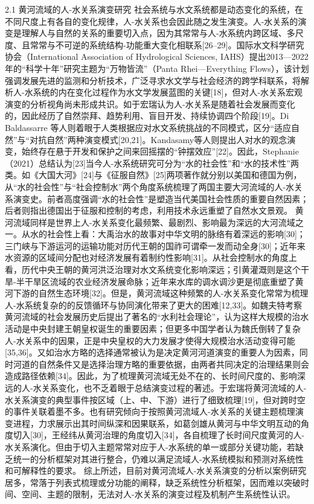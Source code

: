 2.1 黄河流域的人-水关系演变研究
社会系统与水文系统都是动态变化的系统，在不同尺度上有各自的变化规律，人-水关系也会因此随之发生演变。人-水关系的演变是理解人与自然的关系的重要切入点，因为其常常与人-水系统内跨区域、多尺度、且常常与不可逆的系统结构-功能重大变化相联系[26–29]。国际水文科学研究协会（International Association of Hydrological Sciences, IAHS）提出2013—2022年的“科学十年”研究主题为“万物皆流”（Panta Rhei—Everything Flows），该计划强调发展先进的监测和分析技术，广泛寻求水文学与社会经济的跨学科联系，将解析人-水系统的内在变化过程作为水文学发展蓝图的关键[18]，但对人-水关系宏观演变的分析视角尚未形成共识。如于宏瑞认为人-水关系是随着社会发展而变化的，因此经历了自然崇拜、趋势利用、盲目开发、持续协调四个阶段[19]。Di Baldassarre 等人则着眼于人类根据应对水文系统挑战的不同模式，区分“适应自然”与“对抗自然”两种演变模式[20,21]。Kandasamy等人则提出人对水的观念演变，始终存在悬于开发和保护之间来回摇摆的“钟摆效应”[22]。因此，Stephanie（2021）总结认为[23]当今人-水系统研究可分为“水的社会性”和“水的技术性”两类。如《大国大河》[24]与《征服自然》[25]两项著作就分别以美国和德国为例，从“水的社会性”与“社会控制水”两个角度系统梳理了两国主要大河流域的人-水关系演变史。前者高度强调“水的社会性”是塑造当代美国社会性质的重要自然因素；后者则指出德国出于征服和控制的考虑，利用技术永远重塑了自然水文景观。
黄河流域同样是世界上人-水关系变化最频繁、最剧烈、影响最为深远的大河流域之一。从水的社会性上看：大禹治水的故事对中华文明的脉络有着深远的影响[30]；三门峡与下游运河的运输功能对历代王朝的国祚可谓牵一发而动全身[30]；近年来水资源的区域间分配也对经济发展有着制约性影响[31]。从社会控制水的角度上看，历代中央王朝的黄河洪泛治理对水文系统变化影响深远；引黄灌溉则是这个干旱-半干旱区流域的农业经济发展命脉；近年来水库的调水调沙更是彻底重塑了黄河下游的自然生态环境[32]。但是，黄河流域这种频繁的人-水关系变化常常为梳理人-水系统复杂的的反馈循环与协同演化带来了更大的困难[12,33]。如魏夫特考察黄河流域的社会发展历史后提出了著名的“水利社会理论”，认为这样大规模的治水活动是中央封建王朝皇权诞生的重要因素；但更多中国学者认为魏氏倒转了复杂人-水关系中的因果，正是中央皇权的大力发展才使得大规模治水活动变得可能[35,36]。又如治水方略的选择通常被认为是决定黄河河道演变的重要人为因素，同时河道的自然条件又是选择治理方略的重要依据，由两者共同决定的治理结果则会造成路径依赖[34]。因此，为了梳理黄河流域无处不在的、长时间尺度的、影响深远的人-水关系变化，也不乏着眼于总结演变过程的著述。于宏瑞将黄河流域的人-水关系演变的典型事件按区域（上、中、下游）进行了细致梳理[19]，但对跨时空的事件关联着墨不多。也有研究倾向于按照黄河流域人-水关系的关键主题梳理演变进程，力求展示出其时间纵深和因果联系，如葛剑雄从黄河与中华文明互动的角度切入[30]，王经纬从黄河治理的角度切入[34]，各自梳理了长时间尺度黄河的人-水关系演化。但由于切入主题常常对应于人-水系统的单一或部分关键功能，若缺乏统一的分析框架对其进行整合，仍难以满足流域人-水系统模拟和预测对系统性和可解释性的要求。
综上所述，目前对黄河流域人-水关系演变的分析以案例研究居多，常落于列表式梳理或分功能的阐释，缺乏系统性分析框架，因而难以突破时间、空间、主题的限制，无法对人-水关系的演变过程及机制产生系统性认识。

